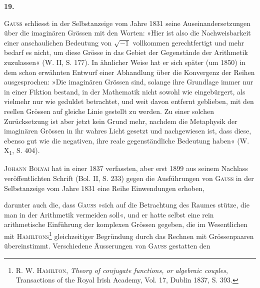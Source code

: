 \clearpage\begingroup{}
\renewcommand{\thefootnote}{\arabic{footnote})}\setcounter{footnote}{0}
\begin{center}
\textbf{19.}\par\smallskip
{}
\end{center}
\noindent\hspace*{\parindent}\textsc{Gauss} schliesst in der Selbstanzeige vom Jahre 1831 seine Auseinandersetzungen
über die imaginären Grössen mit den Worten: »Hier ist also die
Nachweisbarkeit einer anschaulichen Bedeutung von \(\surd{-1}\) vollkommen gerechtfertigt
und mehr bedarf es nicht, um diese Grösse in das Gebiet der
Gegenstände der Arithmetik zuzulassen« (W. II, S. 177). In ähnlicher Weise
hat er sich später (um 1850) in dem schon erwähnten Entwurf einer Abhandlung
über die Konvergenz der Reihen ausgesprochen: »Die imaginären Grössen
sind, solange ihre Grundlage immer nur in einer Fiktion bestand, in der
Mathematik nicht sowohl wie eingebürgert, als vielmehr nur wie geduldet
betrachtet, und weit davon entfernt geblieben, mit den reellen Grössen auf
gleiche Linie gestellt zu werden. Zu einer solchen Zurücksetzung ist aber
jetzt kein Grund mehr, nachdem die Metaphysik der imaginären Grössen in
ihr wahres Licht gesetzt und nachgewiesen ist, dass diese, ebenso gut wie die
negativen, ihre reale gegenständliche Bedeutung haben« (W. X\textsubscript{1}, S. 404).
\par
\textsc{Johann Bolyai} hat in einer 1837 verfassten, aber erst 1899 aus seinem
Nachlass veröffentlichten Schrift (Bol. II, S. 233) gegen die Ausführungen von
\textsc{Gauss} in der Selbstanzeige vom Jahre 1831 eine Reihe Einwendungen erhoben,
\par\smallskip{}\par
\clearpage{}
\noindent darunter auch die, dass \textsc{Gauss} »sich auf die Betrachtung des Raumes stütze,
die man in der Arithmetik vermeiden soll«, und er hatte selbst eine rein
arithmetische Einführung der komplexen Grössen gegeben, die im Wesentlichen
mit \textsc{Hamiltons}\footnote{R. W. \textsc{Hamilton}, \textit{Theory of conjugate functions, or algebraic couples}, Transactions of the Royal Irish Academy, Vol. 17, Dublin 1837, S. 393.} gleichzeitiger Begründung durch das Rechnen mit Grössenpaaren
übereinstimmt. Verschiedene Äusserungen von \textsc{Gauss} gestatten den
